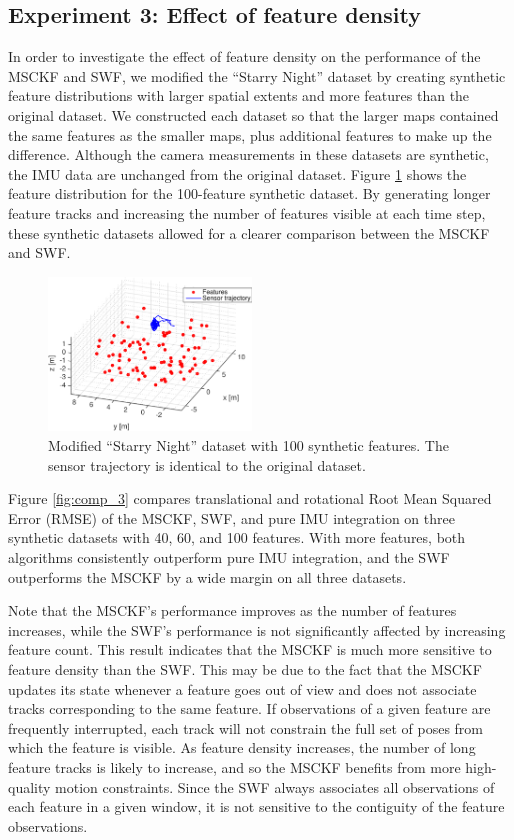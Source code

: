 \documentclass[letterpaper, 10 pt, conference]{ieeeconf}  %
\begin{document}
\subsection{Experiment 3: Effect of feature density}
In order to investigate the effect of feature density on the performance of the MSCKF and SWF, we modified the ``Starry Night'' dataset by creating synthetic feature distributions with larger spatial extents and more features than the original dataset.
We constructed each dataset so that the larger maps contained the same features as the smaller maps, plus additional features to make up the difference.
Although the camera measurements in these datasets are synthetic, the IMU data are unchanged from the original dataset.
Figure \ref{fig:trajectory_groundtruth_100lessnoisy} shows the feature distribution for the 100-feature synthetic dataset.
By generating longer feature tracks and increasing the number of features visible at each time step, these synthetic datasets allowed for a clearer comparison between the MSCKF and SWF.

\begin{figure}
    \centering
    \includegraphics[width=0.48\textwidth]{figs/trajectory_groundtruth_100lessnoisy}
    \caption{Modified ``Starry Night'' dataset with 100 synthetic features. The sensor trajectory is identical to the original dataset.}
    \label{fig:trajectory_groundtruth_100lessnoisy}
\end{figure}

Figure \ref{fig:comp_3} compares translational and rotational Root Mean Squared Error (RMSE) of the MSCKF, SWF, and pure IMU integration on three synthetic datasets with 40, 60, and 100 features.
With more features, both algorithms consistently outperform pure IMU integration, and the SWF outperforms the MSCKF by a wide margin on all three datasets.

Note that the MSCKF's performance improves as the number of features increases, while the SWF's performance is not significantly affected by increasing feature count.
This result indicates that the MSCKF is much more sensitive to feature density than the SWF.
This may be due to the fact that the MSCKF updates its state whenever a feature goes out of view and does not associate tracks corresponding to the same feature.
If observations of a given feature are frequently interrupted, each track will not constrain the full set of poses from which the feature is visible.
As feature density increases, the number of long feature tracks is likely to increase, and so the MSCKF benefits from more high-quality motion constraints.
Since the SWF always associates all observations of each feature in a given window, it is not sensitive to the contiguity of the feature observations.
\end{document}
